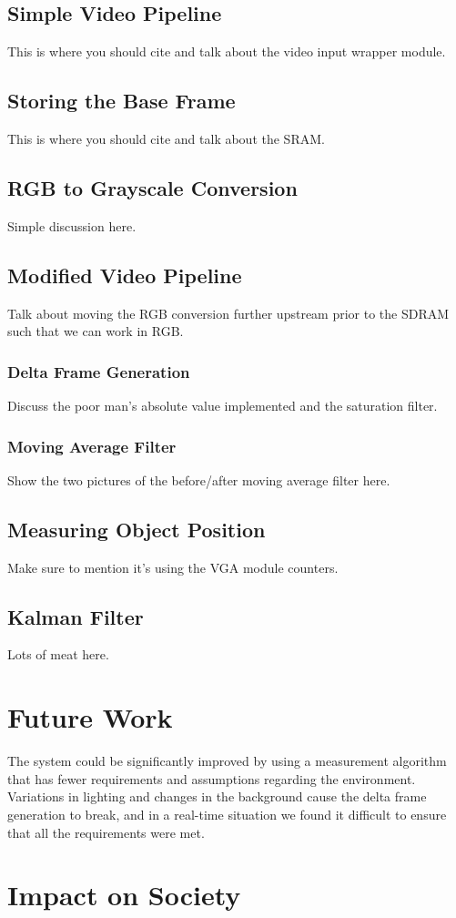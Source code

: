 \documentclass[11pt]{article} %
\begin{document}
\subsection{Simple Video Pipeline}
This is where you should cite \cite{13} and talk about the video input wrapper module.
\subsection{Storing the Base Frame}
This is where you should cite \cite{14} and talk about the SRAM.
\subsection{RGB to Grayscale Conversion}
Simple discussion here.
\subsection{Modified Video Pipeline}
Talk about moving the RGB conversion further upstream prior to the SDRAM such that we can work in RGB.
\subsubsection{Delta Frame Generation}
Discuss the poor man's absolute value implemented and the saturation filter.
\subsubsection{Moving Average Filter}
Show the two pictures of the before/after moving average filter here.
\subsection{Measuring Object Position}
Make sure to mention it's using the VGA module counters.
\subsection{Kalman Filter}
Lots of meat here.
\section{Future Work}
The system could be significantly improved by using a measurement algorithm that has fewer requirements and assumptions regarding the environment. Variations in lighting and changes in the background cause the delta frame generation to break, and in a real-time situation we found it difficult to ensure that all the requirements were met.
\section{Impact on Society}
\end{document}
